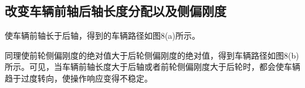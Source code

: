\subsection{改变车辆前轴后轴长度分配以及侧偏刚度}
使车辆前轴长于后轴，得到的车辆路径如图8(a)所示。
\begin{figure}[htbp]
    \centering
\end{figure}

同理使前轮侧偏刚度的绝对值大于后轮侧偏刚度的绝对值，得到车辆路径如图8(b)所示。可见，当车辆前轴长度大于后轴或者前轮侧偏刚度大于后轮时，都会使车辆趋于过度转向，使操作响应变得不稳定。

